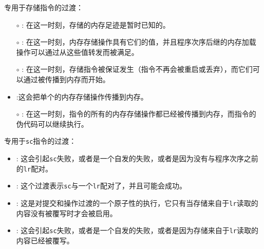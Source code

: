 \noindent 专用于存储指令的过渡：
\begin{itemize}
\item[$\circ$] : 在这一时刻，存储的内存足迹是暂时已知的。
\item[$\circ$] : 在这一时刻，内存存储操作具有它们的值，并且程序次序后继的内存加载操作可以通过从这些值转发而被满足。
\item[$\circ$] : 在这一时刻，存储指令被保证发生（指令不再会被重启或丢弃），而它们可以通过被传播到内存而开始。
\item {}:这会把单个的内存存储操作传播到内存。
\item[$\circ$] : 在这一时刻，指令的所有的内存存储操作都已经被传播到内存，而指令的伪代码可以继续执行。
\end{itemize}

\noindent 专用于{\tt sc}指令的过渡：
\begin{itemize}
\item {}: 这会引起{\tt sc}失败，或者是一个自发的失败，或者是因为没有与程序次序之前的{\tt lr}配对。
\item {}: 这个过渡表示{\tt sc}与一个{\tt lr}配对了，并且可能会成功。
\item {}: 这是对提交和操作过渡的一个原子性的执行，它只有当存储来自于{\tt lr}读取的内容没有被覆写时才会被启用。
\item {}: 这会引起{\tt sc}失败，或者是一个自发的失败，或者是因为存储来自于{\tt lr}读取的内容已经被覆写。
\end{itemize}

